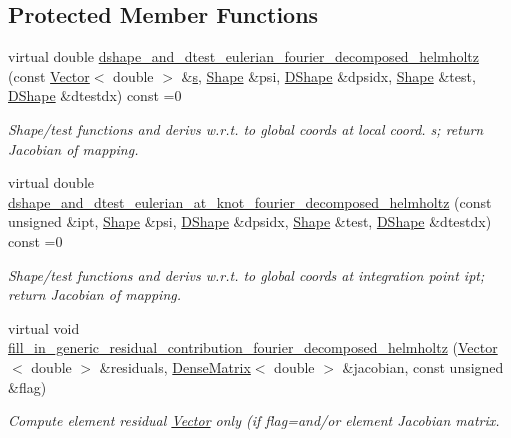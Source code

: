 \subsection*{Protected Member Functions}
\begin{DoxyCompactItemize}
\item 
virtual double \hyperlink{classoomph_1_1FourierDecomposedHelmholtzEquations_a9a0a3a0452e40681fbe610bb7a797252}{dshape\+\_\+and\+\_\+dtest\+\_\+eulerian\+\_\+fourier\+\_\+decomposed\+\_\+helmholtz} (const \hyperlink{classoomph_1_1Vector}{Vector}$<$ double $>$ \&\hyperlink{cfortran_8h_ab7123126e4885ef647dd9c6e3807a21c}{s}, \hyperlink{classoomph_1_1Shape}{Shape} \&psi, \hyperlink{classoomph_1_1DShape}{D\+Shape} \&dpsidx, \hyperlink{classoomph_1_1Shape}{Shape} \&test, \hyperlink{classoomph_1_1DShape}{D\+Shape} \&dtestdx) const =0
\begin{DoxyCompactList}\small\item\em Shape/test functions and derivs w.\+r.\+t. to global coords at local coord. s; return Jacobian of mapping. \end{DoxyCompactList}\item 
virtual double \hyperlink{classoomph_1_1FourierDecomposedHelmholtzEquations_aa19bdb12fe50805a9ad1f75912c85678}{dshape\+\_\+and\+\_\+dtest\+\_\+eulerian\+\_\+at\+\_\+knot\+\_\+fourier\+\_\+decomposed\+\_\+helmholtz} (const unsigned \&ipt, \hyperlink{classoomph_1_1Shape}{Shape} \&psi, \hyperlink{classoomph_1_1DShape}{D\+Shape} \&dpsidx, \hyperlink{classoomph_1_1Shape}{Shape} \&test, \hyperlink{classoomph_1_1DShape}{D\+Shape} \&dtestdx) const =0
\begin{DoxyCompactList}\small\item\em Shape/test functions and derivs w.\+r.\+t. to global coords at integration point ipt; return Jacobian of mapping. \end{DoxyCompactList}\item 
virtual void \hyperlink{classoomph_1_1FourierDecomposedHelmholtzEquations_a0ada3466d3e5ee8e8a548fee6414e3ad}{fill\+\_\+in\+\_\+generic\+\_\+residual\+\_\+contribution\+\_\+fourier\+\_\+decomposed\+\_\+helmholtz} (\hyperlink{classoomph_1_1Vector}{Vector}$<$ double $>$ \&residuals, \hyperlink{classoomph_1_1DenseMatrix}{Dense\+Matrix}$<$ double $>$ \&jacobian, const unsigned \&flag)
\begin{DoxyCompactList}\small\item\em Compute element residual \hyperlink{classoomph_1_1Vector}{Vector} only (if flag=and/or element Jacobian matrix. \end{DoxyCompactList}\end{DoxyCompactItemize}
